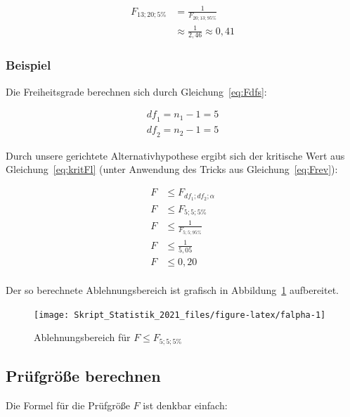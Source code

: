 \documentclass[
  11pt,
  ngerman,
  a4paper,
]{report}
\begin{document}
\[\begin{aligned}
F_{13;20;5\%}&=\frac{1}{F_{20;13;95\%}} \\[5pt]
&\approx\frac{1}{2{,}46}\approx0{,}41
\end{aligned}\]

\hypertarget{beispiel-20}{%
\subsubsection{Beispiel}\label{beispiel-20}}

Die Freiheitsgrade berechnen sich durch Gleichung~\eqref{eq:Fdfs}:

\[\begin{aligned}
\mathit{df}_1=n_1-1=5\\[4pt]
\mathit{df}_2=n_2-1=5
\end{aligned}\]

Durch unsere gerichtete Alternativhypothese ergibt sich der kritische Wert aus Gleichung~\eqref{eq:kritFl} (unter Anwendung des Tricks aus Gleichung~\eqref{eq:Frev}):

\[
\begin{aligned}
F &\leq F_{\mathit{df}_1;\mathit{df}_2;\alpha}\\
F &\leq F_{5;5;5\%}\\[5pt]
F &\leq \frac{1}{F_{5;5;95\%}}\\[5pt]
F &\leq \frac{1}{5{,}05}\\[4pt]
F &\leq 0{,}20\\[4pt]
\end{aligned}
\]

Der so berechnete Ablehnungsbereich ist grafisch in Abbildung~\ref{fig:falpha} aufbereitet.

\begin{figure}[!h]

{\centering \texttt{[image: Skript\_Statistik\_2021\_files/figure-latex/falpha-1]} 

}

\caption{Ablehnungsbereich für $F \leq F_{5;5;5\%}$}\label{fig:falpha}
\end{figure}

\hypertarget{pruxfcfgruxf6uxdfe-berechnen-3}{%
\subsection{Prüfgröße berechnen}\label{pruxfcfgruxf6uxdfe-berechnen-3}}

Die Formel für die Prüfgröße \(F\) ist denkbar einfach:
\end{document}
